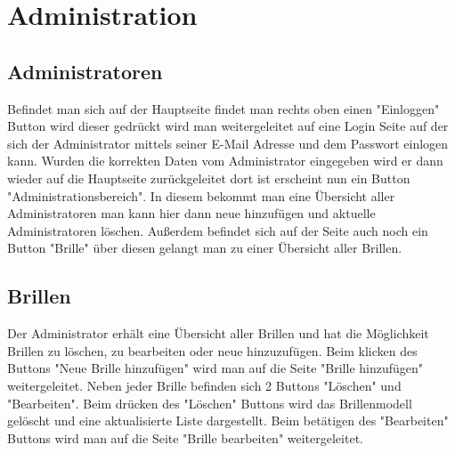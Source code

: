 \section{Administration}

\subsection{Administratoren}
Befindet man sich auf der Hauptseite findet man rechts oben einen "Einloggen" Button wird dieser gedrückt wird man weitergeleitet auf eine Login Seite auf der sich der Administrator mittels seiner E-Mail Adresse und dem Passwort einlogen kann. Wurden die korrekten Daten vom Administrator eingegeben wird er dann wieder auf die Hauptseite zurückgeleitet dort ist erscheint nun ein Button "Administrationsbereich". In diesem bekommt man eine Übersicht aller Administratoren man kann hier dann neue hinzufügen und aktuelle Administratoren löschen. Außerdem befindet sich auf der Seite auch noch ein Button "Brille" über diesen gelangt man zu einer Übersicht aller Brillen.

\subsection{Brillen}
Der Administrator erhält eine Übersicht aller Brillen und hat die Möglichkeit Brillen zu löschen, zu bearbeiten oder neue hinzuzufügen. Beim klicken des Buttons "Neue Brille hinzufügen" wird man auf die Seite "Brille hinzufügen" weitergeleitet. Neben jeder Brille befinden sich 2 Buttons "Löschen" und "Bearbeiten". Beim drücken des "Löschen" Buttons wird das Brillenmodell gelöscht und eine aktualisierte Liste dargestellt. Beim betätigen des "Bearbeiten" Buttons wird man auf die Seite "Brille bearbeiten" weitergeleitet.

